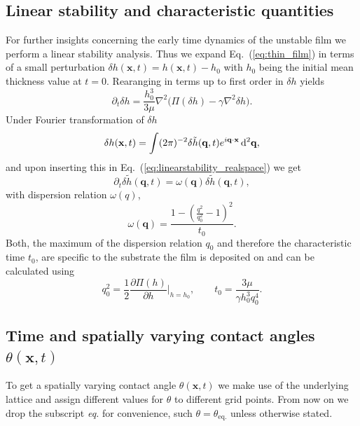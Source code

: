 \documentclass[twocolumn,amsmath,amssymb,showpacs,pre,nofootinbib,superscriptaddress]{revtex4-1} %
\begin{document}
\subsection{Linear stability and characteristic quantities}\label{subsec:charq}
For further insights concerning the early time dynamics of the unstable film we perform a linear stability analysis.
Thus we expand Eq.~(\ref{eq:thin_film}) in terms of a small perturbation $\delta h(\mathbf{x},t) = h(\mathbf{x},t) - h_0$ with $h_0$ being the initial mean thickness value at $t=0$.
Rearanging in terms up to first order in $\delta h$ yields
\begin{equation}\label{eq:linearstability_realspace}
    \partial_t \delta h = \frac{h_0^3}{3\mu}\nabla^2\Big(\Pi(\delta h) - \gamma \nabla^2 \delta h\Big).
\end{equation}
Under Fourier transformation of $\delta h$ 
\begin{equation}\label{eq:fouriertrans}
    \delta h(\mathbf{x},t) = \int(2\pi)^{-2}\delta \tilde{h}(\mathbf{q},t)e^{i\mathbf{q}\cdot\mathbf{x}}\mathop{}\!\mathrm{d^2}\mathbf{q},
\end{equation}
and upon inserting this in Eq.~(\ref{eq:linearstability_realspace}) we get
\begin{equation}\label{eq:linearstab_fourier}
    \partial_t \delta \tilde{h}(\mathbf{q},t) = \omega(\mathbf{q})\delta\tilde{h}(\mathbf{q},t),
\end{equation}
with dispersion relation $\omega(q)$, 
\begin{equation}\label{eq:dispersion}
    \omega(\mathbf{q}) = \frac{1-(\frac{q^2}{q_0^2}-1)^2}{t_0}.
\end{equation}
Both, the maximum of the dispersion relation $q_0$ and therefore the characteristic time $t_0$, are specific to the substrate the film is deposited on and can be calculated using~\cite{PhysRevLett.99.114503}
\begin{equation}\label{eq:q0_and_t0}
    q_0^2 = \frac{1}{2}\frac{\partial \Pi(h)}{\partial h}\bigg\rvert_{h=h_0}, \qquad t_0 = \frac{3\mu}{\gamma h_0^3 q_0^4}.
\end{equation}

\subsection{Time and spatially varying contact angles $\theta(\mathbf{x},t)$}\label{subsec:theta}
To get a spatially varying contact angle $\theta(\mathbf{x},t)$ we make use of the underlying lattice and assign different values for $\theta$ to different grid points. 
From now on we drop the subscript \textit{eq.} for convenience, such $\theta = \theta_{\text{eq.}}$ unless otherwise stated.
\end{document}
